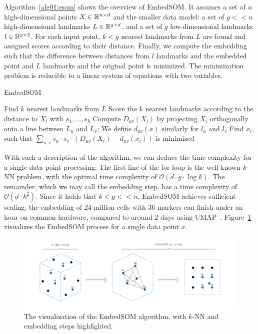 Algorithm~\ref{alg01:esom} shows the overview of EmbedSOM. It assumes a set of $n$ high-dimensional points $X \in \mathbb{R}^{n \times d}$ and the smaller data model: a set of $g << n$ high-dimensional landmarks $L \in \mathbb{R}^{g \times d}$, and a set of $g$ low-dimensional landmarks $l \in \mathbb{R}^{g \times 2}$. For each input point, $k < g$ nearest landmarks from $L$ are found and assigned scores according to their distance. Finally, we compute the embedding such that the difference between distances from $l$ landmarks and the embedded point and $L$ landmarks and the original point is minimized. The minimization problem is reducible to a linear system of equations with two variables.

\begin{algorithm}[t]
    \caption{EmbedSOM}
    \label{alg01:esom}
    \begin{algorithmic}[1]
         
            \State Find $k$ nearest landmarks from $L$
            \State Score the $k$ nearest landmarks according to the distance to $X_i$ with $s_1, \dots, s_k$
             
                \State Compute $D_{uv}(X_i)$ by projecting $X_i$ orthogonally onto a line between $L_u$ and $L_v$; We define $d_{uv}(x)$ similarly for $l_u$ and $l_v$
            \EndFor
            \State Find $x_i$, such that $\sum_{u, v} s_u \cdot s_v \cdot (D_{uv}(X_i) - d_{uv}(x_i))$ is minimized
        \EndFor
        \EndProcedure
    \end{algorithmic}
\end{algorithm}

With such a description of the algorithm, we can deduce the time complexity for a single data point processing: The first line of the for loop is the well-known $k$-NN problem, with the optimal time complexity of $\mathcal{O}(d \cdot g \cdot \log k)$. The remainder, which we may call the embedding step, has a time complexity of $\mathcal{O}(d \cdot k^2)$. Since it holds that $k < g << n$, EmbedSOM achieves sufficient scaling; the embedding of $24$ million cells with $36$ markers can finish under an hour on common hardware, compared to around $2$ days using UMAP~\cite{kratochvil2019som}. Figure~\ref{fig:embedsom} visualizes the EmbedSOM process for a single data point $x$.

\begin{figure}[h]
    \centering
    \includegraphics[width=\textwidth]{img/embedsom.drawio.pdf}
    \caption{The visualization of the EmbedSOM algorithm, with $k$-NN and embedding steps highlighted.}
    \label{fig:embedsom}
\end{figure}

